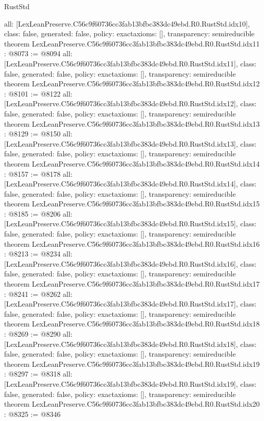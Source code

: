 \begin{lexlean}{RustStd}
\begin{coremodule}
{  all: [LexLeanPreserve.C56c9f60736cc3fab13bfbc383dc49ebd.R0.RustStd.idx10],
  class: false,
  generated: false,
  policy: exact{axioms: []},
  transparency: semireducible
}
theorem LexLeanPreserve.C56c9f60736cc3fab13bfbc383dc49ebd.R0.RustStd.idx11 : @8073 := @8094 {
  all: [LexLeanPreserve.C56c9f60736cc3fab13bfbc383dc49ebd.R0.RustStd.idx11],
  class: false,
  generated: false,
  policy: exact{axioms: []},
  transparency: semireducible
}
theorem LexLeanPreserve.C56c9f60736cc3fab13bfbc383dc49ebd.R0.RustStd.idx12 : @8101 := @8122 {
  all: [LexLeanPreserve.C56c9f60736cc3fab13bfbc383dc49ebd.R0.RustStd.idx12],
  class: false,
  generated: false,
  policy: exact{axioms: []},
  transparency: semireducible
}
theorem LexLeanPreserve.C56c9f60736cc3fab13bfbc383dc49ebd.R0.RustStd.idx13 : @8129 := @8150 {
  all: [LexLeanPreserve.C56c9f60736cc3fab13bfbc383dc49ebd.R0.RustStd.idx13],
  class: false,
  generated: false,
  policy: exact{axioms: []},
  transparency: semireducible
}
theorem LexLeanPreserve.C56c9f60736cc3fab13bfbc383dc49ebd.R0.RustStd.idx14 : @8157 := @8178 {
  all: [LexLeanPreserve.C56c9f60736cc3fab13bfbc383dc49ebd.R0.RustStd.idx14],
  class: false,
  generated: false,
  policy: exact{axioms: []},
  transparency: semireducible
}
theorem LexLeanPreserve.C56c9f60736cc3fab13bfbc383dc49ebd.R0.RustStd.idx15 : @8185 := @8206 {
  all: [LexLeanPreserve.C56c9f60736cc3fab13bfbc383dc49ebd.R0.RustStd.idx15],
  class: false,
  generated: false,
  policy: exact{axioms: []},
  transparency: semireducible
}
theorem LexLeanPreserve.C56c9f60736cc3fab13bfbc383dc49ebd.R0.RustStd.idx16 : @8213 := @8234 {
  all: [LexLeanPreserve.C56c9f60736cc3fab13bfbc383dc49ebd.R0.RustStd.idx16],
  class: false,
  generated: false,
  policy: exact{axioms: []},
  transparency: semireducible
}
theorem LexLeanPreserve.C56c9f60736cc3fab13bfbc383dc49ebd.R0.RustStd.idx17 : @8241 := @8262 {
  all: [LexLeanPreserve.C56c9f60736cc3fab13bfbc383dc49ebd.R0.RustStd.idx17],
  class: false,
  generated: false,
  policy: exact{axioms: []},
  transparency: semireducible
}
theorem LexLeanPreserve.C56c9f60736cc3fab13bfbc383dc49ebd.R0.RustStd.idx18 : @8269 := @8290 {
  all: [LexLeanPreserve.C56c9f60736cc3fab13bfbc383dc49ebd.R0.RustStd.idx18],
  class: false,
  generated: false,
  policy: exact{axioms: []},
  transparency: semireducible
}
theorem LexLeanPreserve.C56c9f60736cc3fab13bfbc383dc49ebd.R0.RustStd.idx19 : @8297 := @8318 {
  all: [LexLeanPreserve.C56c9f60736cc3fab13bfbc383dc49ebd.R0.RustStd.idx19],
  class: false,
  generated: false,
  policy: exact{axioms: []},
  transparency: semireducible
}
theorem LexLeanPreserve.C56c9f60736cc3fab13bfbc383dc49ebd.R0.RustStd.idx20 : @8325 := @8346 {
}
\end{coremodule}
\end{lexlean}
